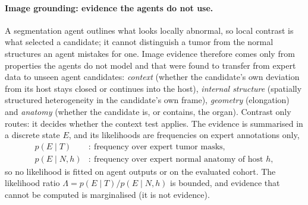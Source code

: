 \documentclass[fleqn,10pt]{olplainarticle}
\begin{document}
\paragraph{Image grounding: evidence the agents do not use.}
A segmentation agent outlines what looks locally abnormal, so local contrast is what selected a candidate; it cannot
distinguish a tumor from the normal structures an agent mistakes for one. Image evidence therefore comes only from
properties the agents do not model and that were found to transfer from expert data to unseen agent candidates:
\emph{context} (whether the candidate's own deviation from its host stays closed or continues into the host),
\emph{internal structure} (spatially structured heterogeneity in the candidate's own frame), \emph{geometry} (elongation)
and \emph{anatomy} (whether the candidate is, or contains, the organ). Contrast only routes:
it decides whether the context test applies. The evidence is summarised in a discrete state $E$, and its likelihoods are
frequencies on expert annotations only,
\begin{equation}
\label{eq:likelihoods}
\begin{aligned}
p(E\mid T)&:\ \text{frequency over expert tumor masks},\\
p(E\mid N,h)&:\ \text{frequency over expert normal anatomy of host }h,
\end{aligned}
\end{equation}
so no likelihood is fitted on agent outputs or on the evaluated cohort. The likelihood ratio
$\Lambda=p(E\mid T)/p(E\mid N,h)$ is bounded, and evidence that cannot be computed is marginalised (it is not evidence).
\end{document}
